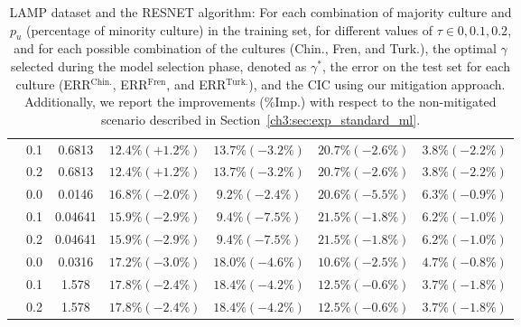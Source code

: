 \begin{table}[H]
\begin{tabular}{c|c|c|c|c|c|c|}
& 0.1 & 0.6813 & $12.4\% (+1.2\%)$ & $13.7\% (\mathbf{-3.2\%})$ & $20.7\% (\mathbf{-2.6\%})$ & $3.8\% (\mathbf{-2.2\%})$ \\
& 0.2 & 0.6813 & $12.4\% (+1.2\%)$ & $13.7\% (\mathbf{-3.2\%})$ & $20.7\% (\mathbf{-2.6\%})$ & $3.8\% (\mathbf{-2.2\%})$ \\
\hhline{-------}
\multirow{3}{*}{Fren} & 0.0 & 0.0146 & $16.8\% (\mathbf{-2.0\%})$ & $9.2\% (\mathbf{-2.4}\%)$ & $20.6\% (\mathbf{-5.5\%})$ & $6.3\% (\mathbf{-0.9\%})$ \\
& 0.1 & 0.04641 & $15.9\% (\mathbf{-2.9\%})$ & $9.4\% (\mathbf{-7.5}\%)$ & $21.5\% (\mathbf{-1.8\%})$ & $6.2\% (\mathbf{-1.0\%})$ \\
& 0.2 & 0.04641 & $15.9\% (\mathbf{-2.9\%})$ & $9.4\% (\mathbf{-7.5}\%)$ & $21.5\% (\mathbf{-1.8\%})$ & $6.2\% (\mathbf{-1.0\%})$ \\
\hhline{-------}
\multirow{3}{*}{Turk.} & 0.0 & 0.0316 & $17.2\% (\mathbf{-3.0\%})$ & $18.0\% (\mathbf{-4.6\%})$ & $10.6\% (\mathbf{-2.5\%})$ & $4.7\% (\mathbf{-0.8\%})$ \\
& 0.1 & 1.578 & $17.8\% (\mathbf{-2.4\%})$ & $18.4\% (\mathbf{-4.2\%})$ & $12.5\% (\mathbf{-0.6\%})$ & $3.7\% (\mathbf{-1.8\%})$ \\
& 0.2 & 1.578 & $17.8\% (\mathbf{-2.4\%})$ & $18.4\% (\mathbf{-4.2\%})$ & $12.5\% (\mathbf{-0.6\%})$ & $3.7\% (\mathbf{-1.8\%})$ \\
\bottomrule
\end{tabular}
\caption{LAMP dataset and the RESNET algorithm: For each combination of majority culture and $p_u$ (percentage of minority culture) in the training set, for different values of $\tau \in {0, 0.1, 0.2}$, and for each possible combination of the cultures (Chin., Fren, and Turk.), the optimal $\gamma$ selected during the model selection phase, denoted as $\gamma^*$, the error on the test set for each culture (ERR$^\text{Chin.}$, ERR$^\text{Fren}$, and ERR$^\text{Turk.}$), and the CIC using our mitigation approach.
Additionally, we report the improvements (\%Imp.) with respect to the non-mitigated scenario described in Section~\ref{ch3:sec:exp_standard_ml}.}
\label{ch3:tab:ris:mtl:lamp}
\end{table}
%
%
